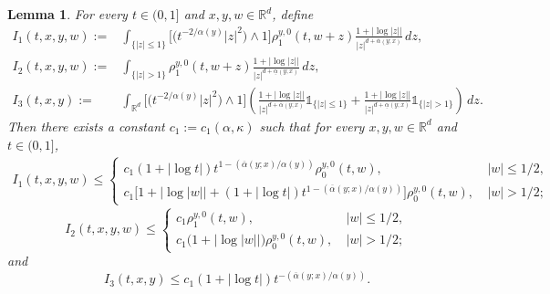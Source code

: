 \documentclass[a4paper,11pt]{amsart}
\renewcommand{\le}{\leqslant}
\newcommand{\R}{\mathds R}
\newcommand{\I}{\mathds 1}
\newcommand{\K}{\kappa}
\newcommand{\A}{\alpha}
\newtheorem{lemma}[theorem]{Lemma}
\theoremstyle{definition}
\begin{document}
\begin{lemma}\label{l1-1}
For every $t \in (0,1]$ and $x,y,w\in \R^d$, define
\begin{equation}\label{l1-1-0}
\begin{split}
I_1(t,x,y,w):=&\int_{\{|z|\le 1\}}\big[\big(t^{-{2}/{\A(y)}}|z|^2\big)\wedge 1\big]
\rho^{y,0}_1(t,w
+
z)\frac{1+|\log|z||}{|z|^{d+\overline{\A}(y;x)}}\,dz,\\
I_2(t,x,y,w):=&\int_{\{|z|>1\}}\rho^{y,0}_1(t,w
+
z)\frac{1+|\log|z||}{|z|^{d+\underline{\A}(y;x)}}\,dz,\\
I_3(t,x,y):=&\int_{\R^d}\big[\big(t^{-{2}/{\A(y)}}|z|^2\big)\wedge 1\big]  \left(
\frac{1+|\log|z||}{|z|^{d+\overline{\A}(y;x)}}\I_{\{|z|\le 1\}}
+\frac{1+|\log|z||}{|z|^{d+\underline{\A}(y;x)}}\I_{\{|z|> 1\}}\right)\,dz.
\end{split}
\end{equation}
Then there exists a constant $c_1:=c_1(\A,\K)$ such that for every
$x,y,w \in \R^d$ and $t \in (0,1]$,
\begin{equation}\label{l1-1-1}
\begin{split}
 I_1(t,x,y,w) \le
\begin{cases}
c_1(1+|\log t|)t^{1-({\overline{\A}(y;x)}/{\A(y)})}\rho^{y,0}_0(t,w),\ & |w|\le {1}/{2},\\
c_1\big[1+|\log|w||+(1+|\log t|)t^{1-({\overline{\A}(y;x)}/{\A(y)})}\big]\rho^{y,0}_0(t,w),\ &
|w|> {1}/{2};
\end{cases}\end{split}
\end{equation}
\begin{equation}\label{l1-1-2}
I_2(t,x,y,w)\le
\begin{cases}
c_1\rho^{y,0}_1(t,w),\ & |w|\le {1}/{2},\\
c_1\big(1+|\log|w||\big)\rho^{y,0}_0(t,w),\ & |w|>{1}/{2};
\end{cases}
\end{equation} and
\begin{equation}\label{l1-1-3}
I_3(t,x,y)\le
c_1(1+|\log t|)t^{-({\overline{\A}(y;x)}/{\A(y)})}.
\end{equation}
\end{lemma}
\end{document}

